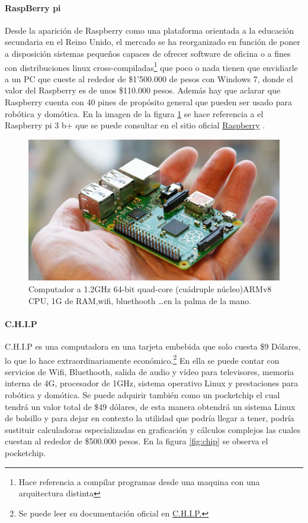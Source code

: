 \documentclass{article}
\begin{document}
\paragraph{RaspBerry pi}

Desde la aparición de Raspberry como una plataforma orientada a la educación
secundaria en el Reino Unido, el mercado se ha reorganizado en función
de poner a disposición sistemas pequeños capaces de ofrecer software de 
oficina o a fines con distribuciones linux 
cross-compiladas\footnote{Hace referencia a compilar programas desde una 
		maquina con una arquitectura distinta } que
poco o nada tienen que envidiarle a un PC que cueste al rededor de
\$1'500.000 de pesos con Windows 7, donde el valor del Raspberry es de unos
\$110.000 pesos.  Además hay que aclarar que Raspberry cuenta con 40 pines
de propósito general que pueden ser usado para robótica y domótica. En la 
imagen de la figura \ref{fig:raspberry} se hace referencia a el Raspberry pi 3 b+ que se puede
consultar en el sitio oficial \href{https://www.raspberrypi.org/}{Raspberry}
.


\begin{figure}[hptp]
    \centering
    \includegraphics[scale=0.38]{imag/raspberryPi2.jpg}
    \caption{Computador a 1.2GHz 64-bit quad-core (cuádruple núcleo)ARMv8 
			CPU, 1G de RAM,wifi, bluethooth \dots en la palma de la mano.}
    \label{fig:raspberry}
\end{figure}
\smallskip

\paragraph{C.H.I.P}

C.H.I.P es una computadora en una tarjeta embebida que solo cuesta \$9 
Dólares, lo que lo hace extraordinariamente económico.\footnote{Se puede 
leer su documentación oficial en \href{http://docs.getchip.com/\#introduction
}{C.H.I.P.}} En ella se puede contar con servicios de Wifi, Bluethooth, 
salida de audio y vídeo para televisores, memoria interna de 4G, 
procesador de 1GHz, sistema operativo Linux y prestaciones para robótica
y domótica. Se puede adquirir también como un pocketchip el cual tendrá
un valor total de \$49 dólares, de esta manera obtendrá un sistema
Linux de bolsillo y para dejar en contexto la utilidad que podría llegar
a tener, podría sustituir calculadoras especializadas en graficación
y cálculos complejos las cuales cuestan al rededor de \$500.000 pesos.
En la figura \ref{fig:chip} se observa el pocketchip.
\end{document}
